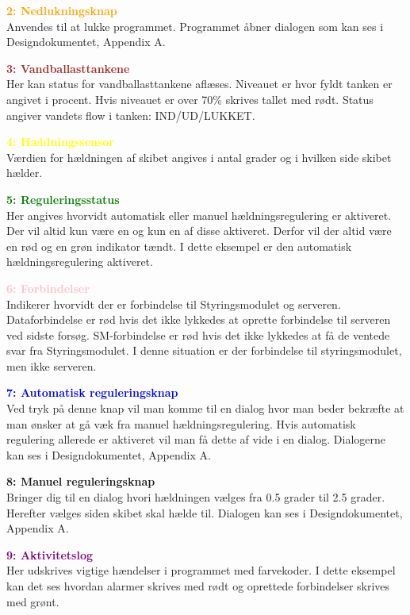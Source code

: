 \textcolor{Orange}{\textbf{2: Nedlukningsknap}}\\
Anvendes til at lukke programmet. Programmet åbner dialogen som kan ses i Designdokumentet, Appendix A.

\textcolor{brown}{\textbf{3: Vandballasttankene}}\\
Her kan status for vandballasttankene aflæses. Niveauet er hvor fyldt tanken er angivet i procent. Hvis niveauet er over 70\% skrives tallet med rødt.
Status angiver vandets flow i tanken: IND/UD/LUKKET.

\textcolor{yellow}{\textbf{4: Hældningssensor}}\\
Værdien for hældningen af skibet angives i antal grader og i hvilken side skibet hælder.

\textcolor{green}{\textbf{5: Reguleringsstatus}}\\
Her angives hvorvidt automatisk eller manuel hældningsregulering er aktiveret. Der vil altid kun være en og kun en af disse aktiveret. Derfor vil der altid være en rød og en grøn indikator tændt. I dette eksempel er den automatisk hældningsregulering aktiveret.
	
\textcolor{pink}{\textbf{6: Forbindelser}}\\
Indikerer hvorvidt der er forbindelse til Styringsmodulet og serveren. Dataforbindelse er rød hvis det ikke lykkedes at oprette forbindelse til serveren ved sidste forsøg.
SM-forbindelse er rød hvis det ikke lykkedes at få de ventede svar fra Styringsmodulet.
I denne situation er der forbindelse til styringsmodulet, men ikke serveren.

\textcolor{blue}{\textbf{7: Automatisk reguleringsknap}}\\
Ved tryk på denne knap vil man komme til en dialog hvor man beder bekræfte at man ønsker at gå væk fra manuel hældningsregulering. Hvis automatisk regulering allerede er aktiveret vil man få dette af vide i en dialog. Dialogerne kan ses i Designdokumentet, Appendix A.

\textcolor{BlueGreen}{\textbf{8: Manuel reguleringsknap}}\\
Bringer dig til en dialog hvori hældningen vælges fra 0.5 grader til 2.5 grader. Herefter vælges siden skibet skal hælde til. Dialogen kan ses i Designdokumentet, Appendix A.

\textcolor{purple}{\textbf{9: Aktivitetslog}}\\
Her udskrives vigtige hændelser i programmet med farvekoder. I dette eksempel kan det ses hvordan alarmer skrives med rødt og oprettede forbindelser skrives med grønt.

